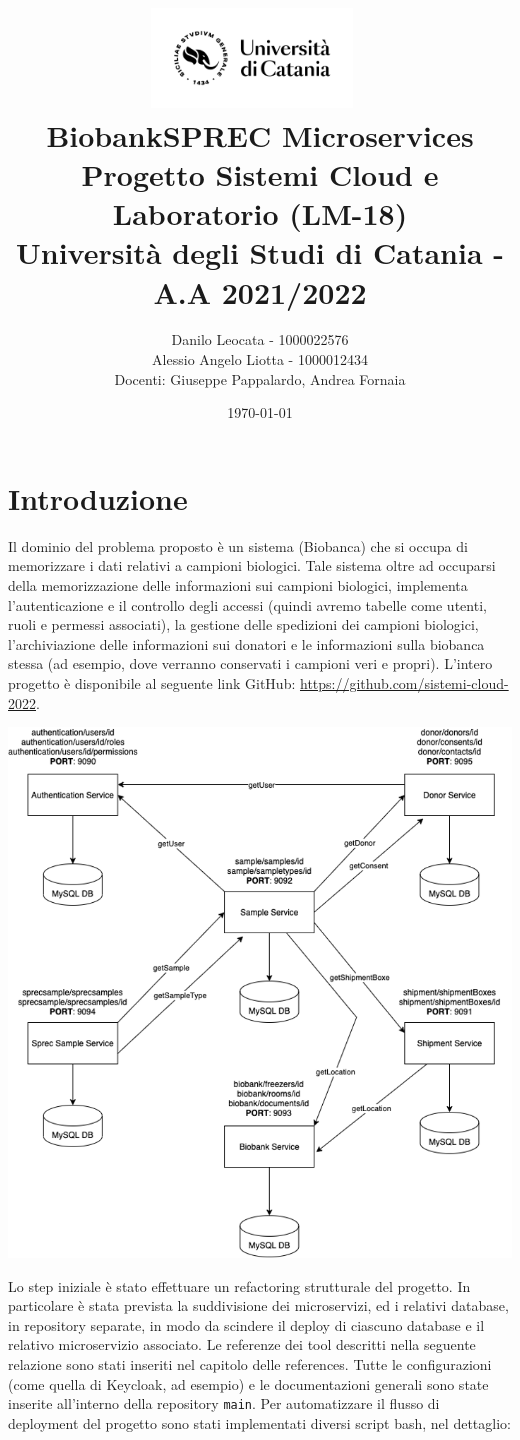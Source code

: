 \documentclass{article}
\title{ %
\includegraphics[width=0.4\textwidth]{UniCT-Logo-Nero}~\\
BiobankSPREC Microservices \\ 
\large Progetto Sistemi Cloud e Laboratorio (LM-18) \\ Università degli Studi di Catania - A.A 2021/2022 \\
}
\author{ Danilo Leocata - 1000022576 \\ Alessio Angelo Liotta - 1000012434 \\Docenti: Giuseppe Pappalardo, Andrea Fornaia}
\date{\today}
\begin{document}
\maketitle %

\pagebreak



\section{Introduzione}

Il dominio del problema proposto è un sistema (Biobanca) che si occupa di
memorizzare i dati relativi a campioni biologici.
Tale sistema oltre ad occuparsi della memorizzazione delle informazioni sui campioni
biologici, implementa l’autenticazione e il controllo degli accessi (quindi avremo
tabelle come utenti, ruoli e permessi associati), la gestione delle spedizioni dei
campioni biologici, l’archiviazione delle informazioni sui donatori e le
informazioni sulla biobanca stessa (ad esempio, dove verranno conservati i campioni
veri e propri). L'intero progetto è disponibile al seguente link GitHub: \href{https://github.com/sistemi-cloud-2022}{https://github.com/sistemi-cloud-2022}.

\begin{center}
    \includegraphics[width=0.6\linewidth]{architettura.png}
\end{center}


Lo step iniziale è stato effettuare un refactoring strutturale del progetto.
In particolare è stata prevista la suddivisione dei microservizi, ed i relativi database, in repository separate, in modo da scindere il deploy di ciascuno database e il relativo microservizio associato.
Le referenze dei tool descritti nella seguente relazione sono stati inseriti nel capitolo delle references.
Tutte le configurazioni (come quella di Keycloak, ad esempio) e le documentazioni generali sono state inserite all’interno della repository \texttt{main}. Per automatizzare il flusso di deployment del progetto sono stati implementati diversi script bash, nel dettaglio:
\end{document}
